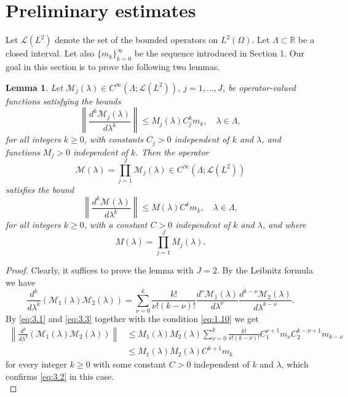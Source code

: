 \documentclass[11pt]{amsart}
\newtheorem{lemma}[Theorem]{Lemma}
\numberwithin{equation}{section}
\def\R{{\mathbb R}}
\begin{document}
 \section{Preliminary estimates}  \label{prelim estimates section}
 
Let $\mathcal{L}(L^2)$ denote the set of the bounded operators on $L^2(\Omega)$. Let $\Lambda\subset\R$ be a closed interval.
Let also $\{m_k\}_{k= 0}^\infty$ be the sequence introduced in Section 1. 
Our goal in this section is to prove the following two lemmas.

\begin{lemma}  \label{3.1} 
Let $\mathcal{M}_j(\lambda)\in C^\infty(\Lambda;\mathcal{L}(L^2))$, $j=1, \dots ,J$, be operator-valued functions 
satisfying the bounds
\begin{equation}\label{eq:3.1}
\left\|\frac{d^k\mathcal{M}_j(\lambda)}{d\lambda^k}\right\|\le M_j(\lambda)C_j^km_k,\quad\lambda\in\Lambda,
\end{equation}
for all integers $k\ge 0$, with constants $C_j>0$ independent of $k$ and $\lambda$, and functions $M_j>0$ independent of $k$.
Then the operator
\begin{equation*}
\mathcal{M}(\lambda)= \prod_{j= 1}^J\mathcal{M}_j(\lambda) \in C^\infty(\Lambda;\mathcal{L}(L^2))
\end{equation*}
satisfies the bound
\begin{equation}\label{eq:3.2}
\left\|\frac{d^k\mathcal{M}(\lambda)}{d\lambda^k}\right\|\le M(\lambda)C^km_k,\quad\lambda\in\Lambda,
\end{equation}
for all integers $k\ge 0$, with a constant $C>0$ independent of $k$ and $\lambda$, and where
\begin{equation*}
M(\lambda)=\prod_{j=1}^JM_j(\lambda).
\end{equation*}
\end{lemma}

\begin{proof} 
Clearly, it suffices to prove the lemma with $J=2$. 
By the Leibnitz formula we have
\begin{equation}\label{eq:3.3}
\frac{d^k}{d\lambda^k}(\mathcal{M}_1(\lambda)\mathcal{M}_2(\lambda))=
\sum_{\nu=0}^k\frac{k!}{\nu!(k-\nu)!}\frac{d^\nu \mathcal{M}_1(\lambda)}{d\lambda^\nu}
\frac{d^{k-\nu}\mathcal{M}_2(\lambda)}{d\lambda^{k-\nu}}.
\end{equation}
By \eqref{eq:3.1} and \eqref{eq:3.3} together with the condition \eqref{eq:1.10} we get
\begin{equation}\label{eq:3.4}
\begin{split}
\left\|\frac{d^k}{d\lambda^k}(\mathcal{M}_1(\lambda)\mathcal{M}_2(\lambda))\right\|
&\le M_1(\lambda)M_2(\lambda)\sum_{\nu=0}^k\frac{k!}{\nu!(k-\nu)!}C_1^{\nu+1}m_\nu C_2^{k-\nu+1}m_{k-\nu}\\
&\le M_1(\lambda)M_2(\lambda)C^{k+1}m_{k}
\end{split}
\end{equation}
for every integer $k \ge 0$ with some constant $C>0$ independent of $k$ and $\lambda$, which confirms \eqref{eq:3.2} in this case. \\
\end{proof}
\end{document}
